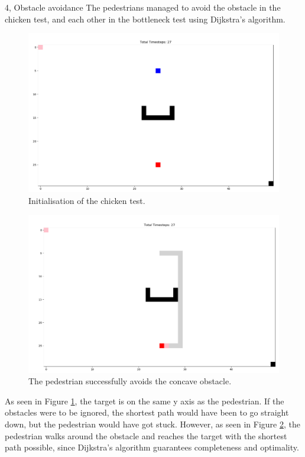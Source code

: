 \documentclass[10pt,a4paper]{article}
\begin{document}
\begin{task}{4, Obstacle avoidance}
The pedestrians managed to avoid the obstacle in the chicken test, and each other in the bottleneck test using Dijkstra’s algorithm. \\
\begin{figure}[h!]
    \centering
    \includegraphics[width=\textwidth]{pictures/start_task4_obst.PNG}
    \caption{Initialisation of the chicken test.}
    \label{fig:obst_start}
\end{figure}
\begin{figure}[h!]
    \centering
    \includegraphics[width=\textwidth]{pictures/end_task4_obst.PNG}
    \caption{The pedestrian successfully avoids the concave obstacle.}
    \label{fig:obst_end}
\end{figure}
As seen in Figure \ref{fig:obst_start}, the target is on the same y axis as the pedestrian. If the obstacles were to be ignored, the shortest path would have been to go straight down, but the pedestrian would have got stuck. However, as seen in Figure \ref{fig:obst_end}, the pedestrian walks around the obstacle and reaches the target with the shortest path possible, since Dijkstra’s algorithm guarantees completeness and optimality. \\

\end{task}
\end{document}
